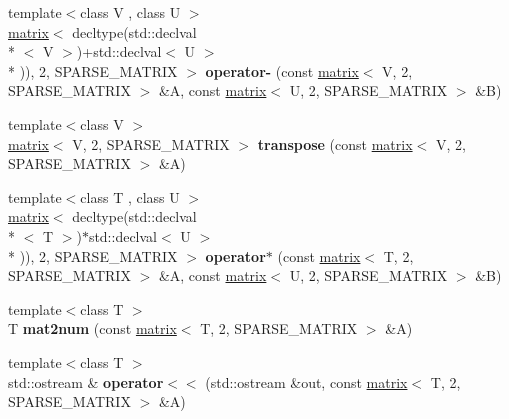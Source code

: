 \begin{DoxyCompactItemize}
\item 
\hypertarget{namespacekeycpp_acf6b4d610217f949a10626f9b144276b}{{\footnotesize template$<$class V , class U $>$ }\\\hyperlink{classkeycpp_1_1matrix}{matrix}$<$ decltype(std\-::declval\\*
$<$ V $>$)+std\-::declval$<$ U $>$\\*
)), 2, S\-P\-A\-R\-S\-E\-\_\-\-M\-A\-T\-R\-I\-X $>$ {\bfseries operator-\/} (const \hyperlink{classkeycpp_1_1matrix}{matrix}$<$ V, 2, S\-P\-A\-R\-S\-E\-\_\-\-M\-A\-T\-R\-I\-X $>$ \&A, const \hyperlink{classkeycpp_1_1matrix}{matrix}$<$ U, 2, S\-P\-A\-R\-S\-E\-\_\-\-M\-A\-T\-R\-I\-X $>$ \&B)}\label{namespacekeycpp_acf6b4d610217f949a10626f9b144276b}

\item 
\hypertarget{namespacekeycpp_a3a287f66a7a810bf784f06817f38bb0b}{{\footnotesize template$<$class V $>$ }\\\hyperlink{classkeycpp_1_1matrix}{matrix}$<$ V, 2, S\-P\-A\-R\-S\-E\-\_\-\-M\-A\-T\-R\-I\-X $>$ {\bfseries transpose} (const \hyperlink{classkeycpp_1_1matrix}{matrix}$<$ V, 2, S\-P\-A\-R\-S\-E\-\_\-\-M\-A\-T\-R\-I\-X $>$ \&A)}\label{namespacekeycpp_a3a287f66a7a810bf784f06817f38bb0b}

\item 
\hypertarget{namespacekeycpp_a8d0c912ddcdb53cde9e68920b6181a53}{{\footnotesize template$<$class T , class U $>$ }\\\hyperlink{classkeycpp_1_1matrix}{matrix}$<$ decltype(std\-::declval\\*
$<$ T $>$)$\ast$std\-::declval$<$ U $>$\\*
)), 2, S\-P\-A\-R\-S\-E\-\_\-\-M\-A\-T\-R\-I\-X $>$ {\bfseries operator$\ast$} (const \hyperlink{classkeycpp_1_1matrix}{matrix}$<$ T, 2, S\-P\-A\-R\-S\-E\-\_\-\-M\-A\-T\-R\-I\-X $>$ \&A, const \hyperlink{classkeycpp_1_1matrix}{matrix}$<$ U, 2, S\-P\-A\-R\-S\-E\-\_\-\-M\-A\-T\-R\-I\-X $>$ \&B)}\label{namespacekeycpp_a8d0c912ddcdb53cde9e68920b6181a53}

\item 
\hypertarget{namespacekeycpp_a8ce47094b7daecf247a8c2ca450192c9}{{\footnotesize template$<$class T $>$ }\\T {\bfseries mat2num} (const \hyperlink{classkeycpp_1_1matrix}{matrix}$<$ T, 2, S\-P\-A\-R\-S\-E\-\_\-\-M\-A\-T\-R\-I\-X $>$ \&A)}\label{namespacekeycpp_a8ce47094b7daecf247a8c2ca450192c9}

\item 
\hypertarget{namespacekeycpp_a69efc9ff27b63c2a4ce9e6a73fa3d019}{{\footnotesize template$<$class T $>$ }\\std\-::ostream \& {\bfseries operator$<$$<$} (std\-::ostream \&out, const \hyperlink{classkeycpp_1_1matrix}{matrix}$<$ T, 2, S\-P\-A\-R\-S\-E\-\_\-\-M\-A\-T\-R\-I\-X $>$ \&A)}\label{namespacekeycpp_a69efc9ff27b63c2a4ce9e6a73fa3d019}


\end{DoxyCompactItemize}
